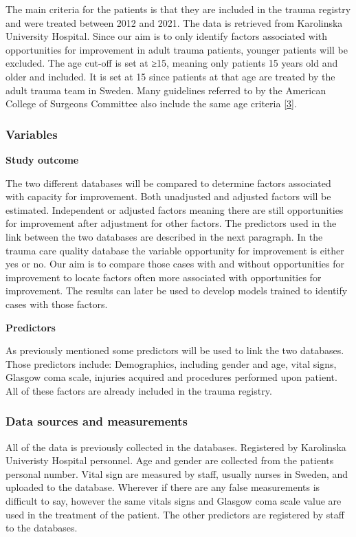 \documentclass[
]{article}
\begin{document}
The main criteria for the patients is that they are included in the
trauma registry and were treated between 2012 and 2021. The data is
retrieved from Karolinska University Hospital. Since our aim is to only
identify factors associated with opportunities for improvement in adult
trauma patients, younger patients will be excluded. The age cut-off is
set at ≥15, meaning only patients 15 years old and older and included.
It is set at 15 since patients at that age are treated by the adult
trauma team in Sweden. Many guidelines referred to by the American
College of Surgeons Committee also include the same age criteria
{[}\protect\hyperlink{ref-Committee2013}{3}{]}.

\hypertarget{variables}{%
\subsubsection{Variables}\label{variables}}

\textbf{Study outcome}

The two different databases will be compared to determine factors
associated with capacity for improvement. Both unadjusted and adjusted
factors will be estimated. Independent or adjusted factors meaning there
are still opportunities for improvement after adjustment for other
factors. The predictors used in the link between the two databases are
described in the next paragraph. In the trauma care quality database the
variable opportunity for improvement is either yes or no. Our aim is to
compare those cases with and without opportunities for improvement to
locate factors often more associated with opportunities for improvement.
The results can later be used to develop models trained to identify
cases with those factors.

\textbf{Predictors}

As previously mentioned some predictors will be used to link the two
databases. Those predictors include: Demographics, including gender and
age, vital signs, Glasgow coma scale, injuries acquired and procedures
performed upon patient. All of these factors are already included in the
trauma registry.

\hypertarget{data-sources-and-measurements}{%
\subsubsection{Data sources and
measurements}\label{data-sources-and-measurements}}

All of the data is previously collected in the databases. Registered by
Karolinska Univeristy Hospital personnel. Age and gender are collected
from the patients personal number. Vital sign are measured by staff,
usually nurses in Sweden, and uploaded to the database. Wherever if
there are any false measurements is difficult to say, however the same
vitals signs and Glasgow coma scale value are used in the treatment of
the patient. The other predictors are registered by staff to the
databases.
\end{document}
